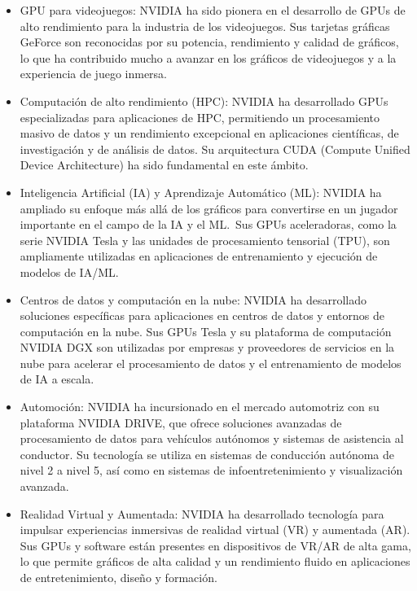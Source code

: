 \documentclass[conference]{IEEEtran}
\begin{document}
\begin{itemize}
	\item GPU para videojuegos:
	      NVIDIA ha sido pionera en el desarrollo de GPUs de alto rendimiento
	      para la industria de los videojuegos. Sus tarjetas gráficas GeForce
	      son reconocidas por su potencia, rendimiento y calidad de gráficos,
	      lo que ha contribuido mucho a avanzar en los gráficos de videojuegos
	      y a la experiencia de juego inmersa.

	\item Computación de alto rendimiento (HPC):
	      NVIDIA ha desarrollado GPUs especializadas para aplicaciones de HPC,
	      permitiendo un procesamiento masivo de datos y un rendimiento
	      excepcional en aplicaciones científicas, de investigación y de
	      análisis de datos. Su arquitectura CUDA
	      (Compute Unified Device Architecture) ha sido fundamental en este
	      ámbito.

	\item Inteligencia Artificial (IA) y Aprendizaje Automático (ML):
	      NVIDIA ha ampliado su enfoque más allá de los gráficos para
	      convertirse en un jugador importante en el campo de la IA y
	      el ML.~Sus GPUs aceleradoras, como la serie NVIDIA Tesla y las
	      unidades de procesamiento tensorial (TPU), son ampliamente utilizadas
	      en aplicaciones de entrenamiento y ejecución de modelos de IA/ML.\@{}

	\item Centros de datos y computación en la nube:
	      NVIDIA ha desarrollado soluciones específicas para aplicaciones
	      en centros de datos y entornos de computación en la nube. Sus
	      GPUs Tesla y su plataforma de computación NVIDIA DGX son
	      utilizadas por empresas y proveedores de servicios en la nube para
	      acelerar el procesamiento de datos y el entrenamiento de modelos
	      de IA a escala.

	\item Automoción:
	      NVIDIA ha incursionado en el mercado automotriz con su plataforma
	      NVIDIA DRIVE, que ofrece soluciones avanzadas de procesamiento
	      de datos para vehículos autónomos y sistemas de asistencia al
	      conductor. Su tecnología se utiliza en sistemas de conducción
	      autónoma de nivel 2 a nivel 5, así como en sistemas de
	      infoentretenimiento y visualización avanzada.

	\item Realidad Virtual y Aumentada:
	      NVIDIA ha desarrollado tecnología para impulsar experiencias
	      inmersivas de realidad virtual (VR) y aumentada (AR). Sus GPUs
	      y software están presentes en dispositivos de VR/AR de alta gama,
	      lo que permite gráficos de alta calidad y un rendimiento fluido
	      en aplicaciones de entretenimiento, diseño y formación.

\end{itemize}
\end{document}
